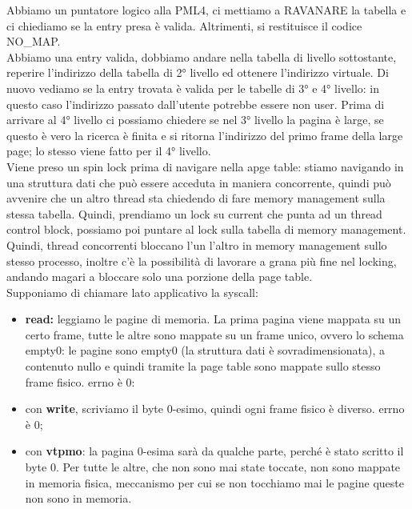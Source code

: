 \documentclass[12pt, oneside]{extbook}
\begin{document}
Abbiamo un puntatore logico alla PML4, ci mettiamo a RAVANARE la tabella e ci chiediamo se la entry presa è valida. Altrimenti, si restituisce il codice NO\_MAP.\\ Abbiamo una entry valida, dobbiamo andare nella tabella di livello sottostante, reperire l'indirizzo della tabella di 2° livello ed ottenere l'indirizzo virtuale. Di nuovo vediamo se la entry trovata è valida per le tabelle di 3° e 4° livello: in questo caso l'indirizzo passato dall'utente potrebbe essere non user. Prima di arrivare al 4° livello ci possiamo chiedere se nel 3° livello la pagina è large, se questo è vero la ricerca è finita e si ritorna l'indirizzo del primo frame della large page; lo stesso viene fatto per il 4° livello.\\ Viene preso un spin lock prima di navigare nella apge table: stiamo navigando in una struttura dati che può essere acceduta in maniera concorrente, quindi può avvenire che un altro thread sta chiedendo di fare memory management sulla stessa tabella. Quindi, prendiamo un lock su current che punta ad un thread control block, possiamo poi puntare al lock sulla tabella di memory management. Quindi, thread concorrenti bloccano l'un l'altro in memory management sullo stesso processo, inoltre c'è la possibilità di lavorare a grana più fine nel locking, andando magari a bloccare solo una porzione della page table.\\ Supponiamo di chiamare lato applicativo la syscall:
\begin{itemize}
\item \textbf{read:} leggiamo le pagine di memoria. La prima pagina viene mappata su un certo frame, tutte le altre sono mappate su un frame unico, ovvero lo schema empty0: le pagine sono empty0 (la struttura dati è sovradimensionata), a contenuto nullo e quindi tramite la page table sono mappate sullo stesso frame fisico. errno è 0:
\item con \textbf{write}, scriviamo il byte 0-esimo, quindi ogni frame fisico è diverso. errno è 0;
\item con \textbf{vtpmo}: la pagina 0-esima sarà da qualche parte, perché è stato scritto il byte 0. Per tutte le altre, che non sono mai state toccate, non sono mappate in memoria fisica, meccanismo per cui se non tocchiamo mai le pagine queste non sono in memoria.
\end{itemize}
\end{document}
